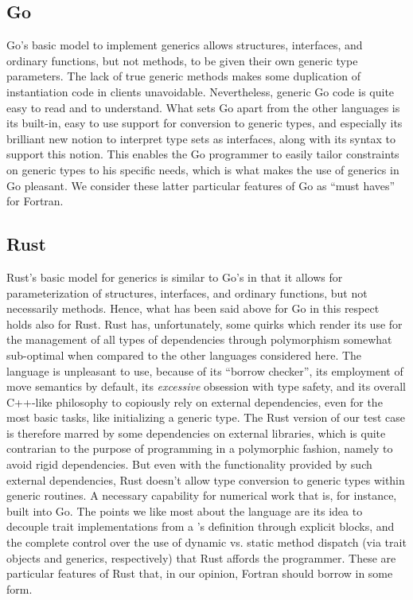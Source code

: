 \documentclass[11pt,oneside]{report}
\newcommand{\code}[1]{{\selectfont\ttfamily{#1}}}
\begin{document}
\subsection{Go}

Go's basic model to implement generics allows structures, interfaces,
and ordinary functions, but not methods, to be given their own generic
type parameters. The lack of true generic methods makes some
duplication of instantiation code in clients
unavoidable. Nevertheless, generic Go code is quite easy to read and
to understand. What sets Go apart from the other languages is its
built-in, easy to use support for conversion to generic types, and
especially its brilliant new notion to interpret type sets as
interfaces, along with its syntax to support this notion. This enables
the Go programmer to easily tailor constraints on generic types to his
specific needs, which is what makes the use of generics in Go
pleasant. We consider these latter particular features of Go as ``must
haves'' for Fortran.

\subsection{Rust}

Rust's basic model for generics is similar to Go's in that it allows
for parameterization of structures, interfaces, and ordinary
functions, but not necessarily methods. Hence, what has been said
above for Go in this respect holds also for Rust. Rust has,
unfortunately, some quirks which render its use for the management of
all types of dependencies through polymorphism somewhat sub-optimal
when compared to the other languages considered here. The language is
unpleasant to use, because of its ``borrow checker'', its employment
of move semantics by default, its \emph{excessive} obsession with type
safety, and its overall C++-like philosophy to copiously rely on
external dependencies, even for the most basic tasks, like
initializing a generic type. The Rust version of our test case is
therefore marred by some dependencies on external libraries, which is
quite contrarian to the purpose of programming in a polymorphic
fashion, namely to avoid rigid dependencies. But even with the
functionality provided by such external dependencies, Rust doesn't
allow type conversion to generic types within generic routines. A
necessary capability for numerical work that is, for instance, built
into Go. The points we like most about the language are its idea to
decouple trait implementations from a \code{struct}'s definition
through explicit \code{impl} blocks, and the complete control over the
use of dynamic vs. static method dispatch (via trait objects and
generics, respectively) that Rust affords the programmer. These are
particular features of Rust that, in our opinion, Fortran should
borrow in some form.
\end{document}
